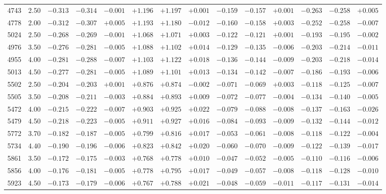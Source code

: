 \documentclass[]{aa}
\begin{document}
\begin{appendix}
\begin{table*}
\begin{center}
\begin{tabular}{llllllllllllll}
4743  &2.50 & $-0.313$ &$ -0.314$ &$ -0.001$ &$ +1.196$ &$ +1.197$ &$ +0.001$ &$ -0.159$ &$ -0.157$ &$ +0.001$ &$ -0.263$&$ -0.258$&$ +0.005$\\
4778  &2.00 & $-0.312$ &$ -0.307$ &$ +0.005$ &$ +1.193$ &$ +1.180$ &$ -0.012$ &$ -0.160$ &$ -0.158$ &$ +0.003$ &$ -0.252$&$ -0.258$&$ -0.007$\\
5024  &2.50 & $-0.268$ &$ -0.269$ &$ -0.001$ &$ +1.068$ &$ +1.071$ &$ +0.003$ &$ -0.122$ &$ -0.121$ &$ +0.001$ &$ -0.193$&$ -0.195$&$ -0.002$\\
4976  &3.50 & $-0.276$ &$ -0.281$ &$ -0.005$ &$ +1.088$ &$ +1.102$ &$ +0.014$ &$ -0.129$ &$ -0.135$ &$ -0.006$ &$ -0.203$&$ -0.214$&$ -0.011$\\
4955  &4.00 & $-0.281$ &$ -0.288$ &$ -0.007$ &$ +1.103$ &$ +1.122$ &$ +0.018$ &$ -0.136$ &$ -0.144$ &$ -0.009$ &$ -0.203$&$ -0.218$&$ -0.014$\\
5013  &4.50 & $-0.277$ &$ -0.281$ &$ -0.005$ &$ +1.089$ &$ +1.101$ &$ +0.013$ &$ -0.134$ &$ -0.142$ &$ -0.007$ &$ -0.186$&$ -0.193$&$ -0.006$\\
5502  &2.50 & $-0.204$ &$ -0.203$ &$ +0.001$ &$ +0.876$ &$ +0.874$ &$ -0.002$ &$ -0.071$ &$ -0.069$ &$ +0.003$ &$ -0.118$&$ -0.125$&$ -0.007$\\
5505  &3.50 & $-0.208$ &$ -0.211$ &$ -0.003$ &$ +0.884$ &$ +0.893$ &$ +0.009$ &$ -0.072$ &$ -0.077$ &$ -0.004$ &$ -0.134$&$ -0.140$&$ -0.005$\\
5472  &4.00 & $-0.215$ &$ -0.222$ &$ -0.007$ &$ +0.903$ &$ +0.925$ &$ +0.022$ &$ -0.079$ &$ -0.088$ &$ -0.008$ &$ -0.137$&$ -0.163$&$ -0.026$\\
5479  &4.50 & $-0.218$ &$ -0.223$ &$ -0.005$ &$ +0.911$ &$ +0.927$ &$ +0.016$ &$ -0.084$ &$ -0.093$ &$ -0.009$ &$ -0.132$&$ -0.144$&$ -0.012$\\
5772  &3.70 & $-0.182$ &$ -0.187$ &$ -0.005$ &$ +0.799$ &$ +0.816$ &$ +0.017$ &$ -0.053$ &$ -0.061$ &$ -0.008$ &$ -0.118$&$ -0.122$&$ -0.004$\\
5734  &4.40 & $-0.190$ &$ -0.196$ &$ -0.006$ &$ +0.823$ &$ +0.842$ &$ +0.020$ &$ -0.060$ &$ -0.070$ &$ -0.009$ &$ -0.122$&$ -0.139$&$ -0.017$\\
5861  &3.50 & $-0.172$ &$ -0.175$ &$ -0.003$ &$ +0.768$ &$ +0.778$ &$ +0.010$ &$ -0.047$ &$ -0.052$ &$ -0.005$ &$ -0.110$&$ -0.116$&$ -0.006$\\
5856  &4.00 & $-0.176$ &$ -0.181$ &$ -0.005$ &$ +0.778$ &$ +0.795$ &$ +0.017$ &$ -0.049$ &$ -0.057$ &$ -0.008$ &$ -0.118$&$ -0.128$&$ -0.010$\\
5923  &4.50 & $-0.173$ &$ -0.179$ &$ -0.006$ &$ +0.767$ &$ +0.788$ &$ +0.021$ &$ -0.048$ &$ -0.059$ &$ -0.011$ &$ -0.117$&$ -0.131$&$ -0.014$\\

\end{tabular}
\end{center}
\end{table*}
\end{appendix}
\end{document}
